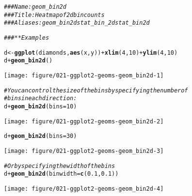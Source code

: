 \documentclass[a4paper,titlepage]{tufte-handout}\usepackage[]{graphicx}\usepackage[]{color}
\makeatletter
\def\maxwidth{ %
  \ifdim\Gin@nat@width>\linewidth
    \linewidth
  \else
    \Gin@nat@width
  \fi
}
\newcommand{\hlnum}[1]{\textcolor[rgb]{0.686,0.059,0.569}{#1}}%
\newcommand{\hlcom}[1]{\textcolor[rgb]{0.678,0.584,0.686}{\textit{#1}}}%
\newcommand{\hlopt}[1]{\textcolor[rgb]{0,0,0}{#1}}%
\newcommand{\hlstd}[1]{\textcolor[rgb]{0.345,0.345,0.345}{#1}}%
\newcommand{\hlkwb}[1]{\textcolor[rgb]{0.69,0.353,0.396}{#1}}%
\newcommand{\hlkwc}[1]{\textcolor[rgb]{0.333,0.667,0.333}{#1}}%
\newcommand{\hlkwd}[1]{\textcolor[rgb]{0.737,0.353,0.396}{\textbf{#1}}}%
\newenvironment{kframe}{%
 \def\at@end@of@kframe{}%
 \ifinner\ifhmode%
  \def\at@end@of@kframe{\end{minipage}}%
  \begin{minipage}{\columnwidth}%
 \fi\fi%
 \def\FrameCommand##1{\hskip\@totalleftmargin \hskip-\fboxsep
 \colorbox{shadecolor}{##1}\hskip-\fboxsep
     \hskip-\linewidth \hskip-\@totalleftmargin \hskip\columnwidth}%
 \MakeFramed {\advance\hsize-\width
   \@totalleftmargin\z@ \linewidth\hsize
   \@setminipage}}%
 {\par\unskip\endMakeFramed%
 \at@end@of@kframe}
\newenvironment{knitrout}{}{} %
\makeatother
\begin{document}
\begin{knitrout}
\color{fgcolor}\begin{kframe}
\begin{alltt}
\hlcom{### Name: geom_bin2d}
\hlcom{### Title: Heatmap of 2d bin counts}
\hlcom{### Aliases: geom_bin2d stat_bin_2d stat_bin2d}

\hlcom{### ** Examples}

\hlstd{d} \hlkwb{<-} \hlkwd{ggplot}\hlstd{(diamonds,} \hlkwd{aes}\hlstd{(x, y))} \hlopt{+} \hlkwd{xlim}\hlstd{(}\hlnum{4}\hlstd{,} \hlnum{10}\hlstd{)} \hlopt{+} \hlkwd{ylim}\hlstd{(}\hlnum{4}\hlstd{,} \hlnum{10}\hlstd{)}
\hlstd{d} \hlopt{+} \hlkwd{geom_bin2d}\hlstd{()}
\end{alltt}


{\ttfamily\noindent\color{warningcolor}{\#\# Warning: Removed 478 rows containing non-finite values (stat\_bin2d).}}\end{kframe}
\texttt{[image: figure/021-ggplot2-geoms-geom\_bin2d-1]} 
\begin{kframe}\begin{alltt}
\hlcom{# You can control the size of the bins by specifying the number of}
\hlcom{# bins in each direction:}
\hlstd{d} \hlopt{+} \hlkwd{geom_bin2d}\hlstd{(}\hlkwc{bins} \hlstd{=} \hlnum{10}\hlstd{)}
\end{alltt}


{\ttfamily\noindent\color{warningcolor}{\#\# Warning: Removed 478 rows containing non-finite values (stat\_bin2d).}}

{\ttfamily\noindent\color{warningcolor}{\#\# Warning: Removed 4 rows containing missing values (geom\_tile).}}\end{kframe}
\texttt{[image: figure/021-ggplot2-geoms-geom\_bin2d-2]} 
\begin{kframe}\begin{alltt}
\hlstd{d} \hlopt{+} \hlkwd{geom_bin2d}\hlstd{(}\hlkwc{bins} \hlstd{=} \hlnum{30}\hlstd{)}
\end{alltt}


{\ttfamily\noindent\color{warningcolor}{\#\# Warning: Removed 478 rows containing non-finite values (stat\_bin2d).}}\end{kframe}
\texttt{[image: figure/021-ggplot2-geoms-geom\_bin2d-3]} 
\begin{kframe}\begin{alltt}
\hlcom{# Or by specifying the width of the bins}
\hlstd{d} \hlopt{+} \hlkwd{geom_bin2d}\hlstd{(}\hlkwc{binwidth} \hlstd{=} \hlkwd{c}\hlstd{(}\hlnum{0.1}\hlstd{,} \hlnum{0.1}\hlstd{))}
\end{alltt}


{\ttfamily\noindent\color{warningcolor}{\#\# Warning: Removed 478 rows containing non-finite values (stat\_bin2d).}}\end{kframe}
\texttt{[image: figure/021-ggplot2-geoms-geom\_bin2d-4]} 

\end{knitrout}
\end{document}
